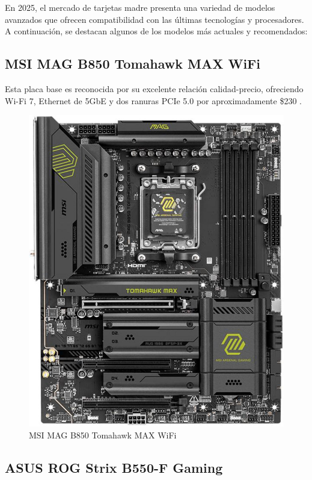 En 2025, el mercado de tarjetas madre presenta una variedad de modelos avanzados que ofrecen compatibilidad con las últimas tecnologías y procesadores. A continuación, se destacan algunos de los modelos más actuales y recomendados:

\subsection{MSI MAG B850 Tomahawk MAX WiFi}

Esta placa base es reconocida por su excelente relación calidad-precio, ofreciendo Wi-Fi 7, Ethernet de 5GbE y dos ranuras PCIe 5.0 por aproximadamente \$230 \cite{tomshardware2025}.

\begin{figure}[H]
  \centering
  \includegraphics[scale=0.1]{imagenes/tomahawk.png}
  \caption{MSI MAG B850 Tomahawk MAX WiFi}
\end{figure}

\subsection{ASUS ROG Strix B550-F Gaming}

